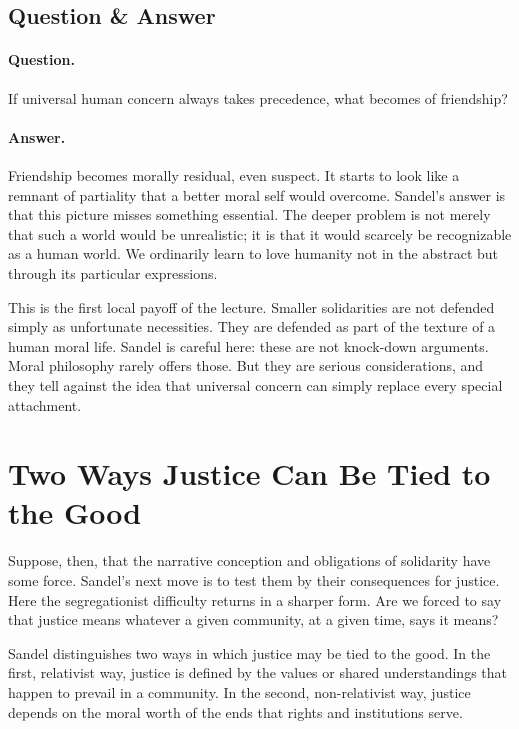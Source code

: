 \subsection{Question \& Answer}

\paragraph{Question.} If universal human concern always takes precedence, what becomes of friendship?

\paragraph{Answer.} Friendship becomes morally residual, even suspect. It starts to look like a remnant of partiality that a better moral self would overcome. Sandel's answer is that this picture misses something essential. The deeper problem is not merely that such a world would be unrealistic; it is that it would scarcely be recognizable as a human world. We ordinarily learn to love humanity not in the abstract but through its particular expressions.

This is the first local payoff of the lecture. Smaller solidarities are not defended simply as unfortunate necessities. They are defended as part of the texture of a human moral life. Sandel is careful here: these are not knock-down arguments. Moral philosophy rarely offers those. But they are serious considerations, and they tell against the idea that universal concern can simply replace every special attachment.

\section{Two Ways Justice Can Be Tied to the Good}

Suppose, then, that the narrative conception and obligations of solidarity have some force. Sandel's next move is to test them by their consequences for justice. Here the segregationist difficulty returns in a sharper form. Are we forced to say that justice means whatever a given community, at a given time, says it means?

\begin{definition}
Sandel distinguishes two ways in which justice may be tied to the good. In the first, relativist way, justice is defined by the values or shared understandings that happen to prevail in a community. In the second, non-relativist way, justice depends on the moral worth of the ends that rights and institutions serve.
\end{definition}

